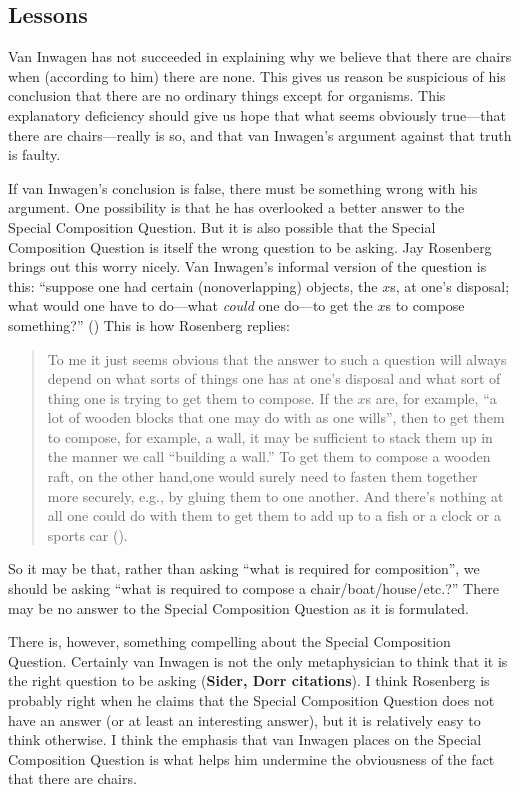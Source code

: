\documentclass[11pt]{article}
\begin{document}
\begin{spacing}{1.5}
\section{Lessons}
\label{lessons-v}
Van Inwagen has not succeeded in explaining why we believe that there
are chairs when (according to him) there are none.  This gives us
reason be suspicious of his conclusion that there are no ordinary
things except for organisms.  This explanatory deficiency should give
us hope that what seems obviously true---that there are
chairs---really is so, and that van Inwagen's argument against that
truth is faulty.

If van Inwagen's conclusion is false, there must be something wrong
with his argument.  One possibility is that he has overlooked a better
answer to the Special Composition Question.  But it is also possible
that the Special Composition Question is itself the wrong question to
be asking.  Jay Rosenberg brings out this worry nicely.  Van Inwagen's
informal version of the question is this: ``suppose one had certain
(nonoverlapping) objects, the $x$s, at one's disposal; what would one
have to do---what {\em could} one do---to get the $x$s to compose
something?''  (\citeyear[31]{inwagen1995}) This is how Rosenberg
replies:

\begin{quote}
To me it just seems obvious that the answer to such a question will
always depend on what sorts of things one has at one's disposal and
what sort of thing one is trying to get them to compose.  If the $x$s
are, for example, ``a lot of wooden blocks that one may do with as one
wills'', then to get them to compose, for example, a wall, it may be
sufficient to stack them up in the manner we call ``building a wall.''
To get them to compose a wooden raft, on the other hand,one would
surely need to fasten them together more securely, e.g., by gluing
them to one another.  And there's nothing at all one could do with
them to get them to add up to a fish or a clock or a sports car
(\citeyear[705]{rosenberg1993}).
\end{quote}

So it may be that, rather than asking ``what is required for
composition'', we should be asking ``what is required to compose a
chair/boat/house/etc.?''  There may be no answer to the Special
Composition Question as it is formulated.

There is, however, something compelling about the Special Composition
Question.  Certainly van Inwagen is not the only metaphysician to
think that it is the right question to be asking (\textbf{Sider, Dorr
  citations}).  I think Rosenberg is probably right when he claims
that the Special Composition Question does not have an answer (or at
least an interesting answer), but it is relatively easy to think
otherwise.  I think the emphasis that van Inwagen places on the
Special Composition Question is what helps him undermine the
obviousness of the fact that there are chairs.


\end{spacing}
\end{document}
